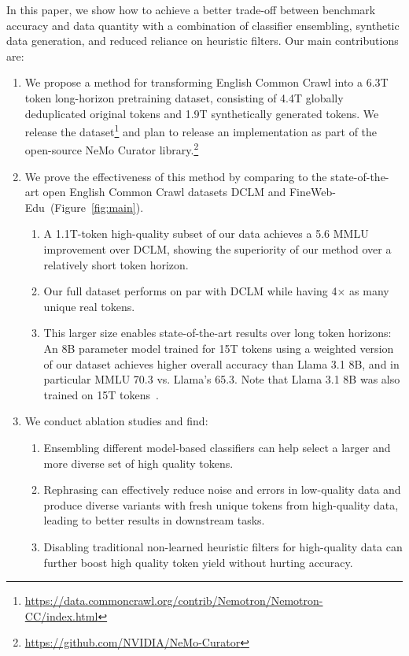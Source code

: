 \documentclass[11pt]{article}
\newcommand{\DCLM}{\textsc{DCLM}\xspace}
\begin{document}
In this paper, we show how to achieve a better trade-off between benchmark accuracy and data quantity with a combination of classifier ensembling, synthetic data generation, and reduced reliance on heuristic filters. Our main contributions are:
\begin{enumerate}
\item We propose a method for transforming English Common Crawl into a 6.3T token long-horizon pretraining dataset, consisting of 4.4T globally deduplicated original tokens and 1.9T synthetically generated tokens.
We release the dataset\footnote{\url{https://data.commoncrawl.org/contrib/Nemotron/Nemotron-CC/index.html}} and plan to release an implementation as part of the open-source NeMo Curator library.\footnote{\url{https://github.com/NVIDIA/NeMo-Curator}}
\item We prove the effectiveness of this method by comparing to the state-of-the-art open English Common Crawl datasets \DCLM and FineWeb-Edu~(Figure~\ref{fig:main}).
\begin{enumerate}
\item A 1.1T-token high-quality subset of our data achieves a 5.6 MMLU improvement over \DCLM, showing the superiority of our method over a relatively short token horizon.
\item Our full dataset performs on par with \DCLM while having 4$\times$ as many unique real tokens.
\item This larger size enables state-of-the-art results over long token horizons: An 8B parameter model trained for 15T tokens using a weighted version of our dataset achieves higher overall accuracy than Llama 3.1 8B, and in particular MMLU 70.3 vs. Llama's 65.3. Note that Llama 3.1 8B was also trained on 15T tokens~\citep{dubey2024llama}.
\end{enumerate}
\item We conduct ablation studies and find:
\begin{enumerate}
\item Ensembling different model-based classifiers can help select a larger and more diverse set of high quality tokens.
\item Rephrasing can effectively reduce noise and errors in low-quality data and produce diverse variants with fresh unique tokens from high-quality data, leading to better results in downstream tasks.
\item Disabling traditional non-learned heuristic filters for high-quality data can further boost high quality token yield without hurting accuracy.
\end{enumerate}
\end{enumerate}
\end{document}
